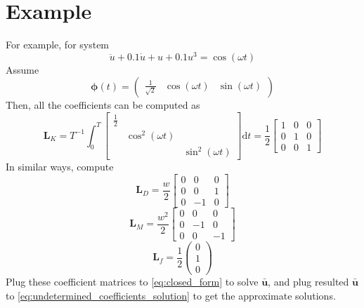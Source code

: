 \documentclass[10pt,letterpaper]{article}
\begin{document}
\section{Example}
For example, for system
\begin{equation}\label{eq:example}
\ddot{u} + 0.1 \dot{u} + u + 0.1u^3 = \cos(\omega t)
\end{equation}
Assume 
\begin{equation}
	\boldsymbol\phi(t) = 
	\begin{pmatrix}
		\frac{1}{\sqrt{2}} &\cos(\omega t)	&\sin(\omega t)
	\end{pmatrix}
\end{equation}
Then, all the coefficients can be computed as 
\begin{equation}
\mathbf L_K = T^{-1} \int_0^{T} 
\begin{bmatrix}
\frac{1}{2}	& 	&
\\	&\cos^2(\omega t)	&
\\	&	&\sin^2(\omega t)
\end{bmatrix}\mathrm dt
=\frac{1}{2}
\begin{bmatrix}
1	&0	&0
\\0	&1	&0
\\0	&0	&1
\end{bmatrix}
\end{equation}
In similar ways, compute
\begin{equation}
\mathbf L_D = \frac{w}{2}
\begin{bmatrix}
0	&0	&0
\\0	&0	&1
\\0	&-1	&0
\end{bmatrix}
\end{equation}
\begin{equation}
\mathbf L_M = \frac{w^2}{2}
\begin{bmatrix}
0	&0	&0
\\0	&-1	&0
\\0	&0	&-1
\end{bmatrix}
\end{equation}
\begin{equation}
\mathbf L_f = \frac{1}{2}
\begin{pmatrix}
0	\\1	\\0
\end{pmatrix}
\end{equation}
Plug these coefficient matrices to \eqref{eq:closed_form} to solve $\bar{\mathbf u}$, and plug resulted $\bar{\mathbf u}$ to \eqref{eq:undetermined_coefficients_solution} to get the approximate solutions. 
\end{document}
